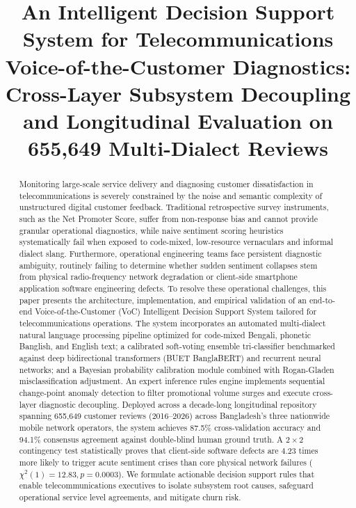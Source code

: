 \documentclass[5p,twocolumn,authoryear]{elsarticle}
\begin{document}
\begin{frontmatter}

\title{An Intelligent Decision Support System for Telecommunications Voice-of-the-Customer Diagnostics: Cross-Layer Subsystem Decoupling and Longitudinal Evaluation on 655,649 Multi-Dialect Reviews}

\begin{abstract}
Monitoring large-scale service delivery and diagnosing customer dissatisfaction in telecommunications is severely constrained by the noise and semantic complexity of unstructured digital customer feedback. Traditional retrospective survey instruments, such as the Net Promoter Score, suffer from non-response bias and cannot provide granular operational diagnostics, while naive sentiment scoring heuristics systematically fail when exposed to code-mixed, low-resource vernaculars and informal dialect slang. Furthermore, operational engineering teams face persistent diagnostic ambiguity, routinely failing to determine whether sudden sentiment collapses stem from physical radio-frequency network degradation or client-side smartphone application software engineering defects. To resolve these operational challenges, this paper presents the architecture, implementation, and empirical validation of an end-to-end Voice-of-the-Customer (VoC) Intelligent Decision Support System tailored for telecommunications operations. The system incorporates an automated multi-dialect natural language processing pipeline optimized for code-mixed Bengali, phonetic Banglish, and English text; a calibrated soft-voting ensemble tri-classifier benchmarked against deep bidirectional transformers (BUET BanglaBERT) and recurrent neural networks; and a Bayesian probability calibration module combined with Rogan-Gladen misclassification adjustment. An expert inference rules engine implements sequential change-point anomaly detection to filter promotional volume surges and execute cross-layer diagnostic decoupling. Deployed across a decade-long longitudinal repository spanning 655,649 customer reviews (2016--2026) across Bangladesh's three nationwide mobile network operators, the system achieves 87.5\% cross-validation accuracy and 94.1\% consensus agreement against double-blind human ground truth. A $2 \times 2$ contingency test statistically proves that client-side software defects are 4.23 times more likely to trigger acute sentiment crises than core physical network failures ($\chi^2(1) = 12.83, p = 0.0003$). We formulate actionable decision support rules that enable telecommunications executives to isolate subsystem root causes, safeguard operational service level agreements, and mitigate churn risk.
\end{abstract}


\end{frontmatter}
\end{document}
